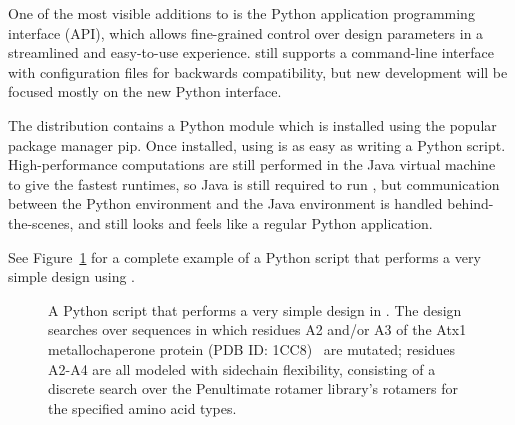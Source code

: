 
One of the most visible additions to  is the Python application programming interface (API), which allows fine-grained control over design parameters in a streamlined and easy-to-use experience.  still supports a command-line interface with configuration files for backwards compatibility, but new development will be focused mostly on the new Python interface. %

The  distribution contains a Python module which is installed using the popular package manager {\sc pip}. Once installed, using  is as easy as writing a Python script. High-performance computations are still performed in the Java virtual machine to give the fastest runtimes, so Java is still required to run , but communication between the Python environment and the Java environment is handled behind-the-scenes, and  still looks and feels like a regular Python application.

See Figure~\ref{fig:python} for a complete example of a Python script that performs a very simple design using .

\begin{figure}
{
	
}
\caption{A Python script that performs a very simple design in .  The design searches over sequences in which residues A2 and/or A3 of the Atx1 metallochaperone protein (PDB ID: 1CC8)~\cite{1CC8} are mutated; residues A2-A4 are all modeled with sidechain flexibility, consisting of a discrete search over the Penultimate rotamer library\cite{penultimate}'s rotamers for the specified amino acid types.  }
\label{fig:python}
\end{figure}
